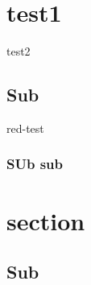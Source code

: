 \documentclass{cheatsheet}
\author{Micha Bosshart - bmicha@ethz.ch}
\newcommand*{\foo}[2][\customColor]{#1-#2}
\begin{document}
\section[sku]{test1}{test2}
    \subsection{Sub}
    \foo[red]{test}
        \subsubsection{SUb sub }
                
\section{section}
\subsection{Sub}
\blindtext{}
\end{document}
